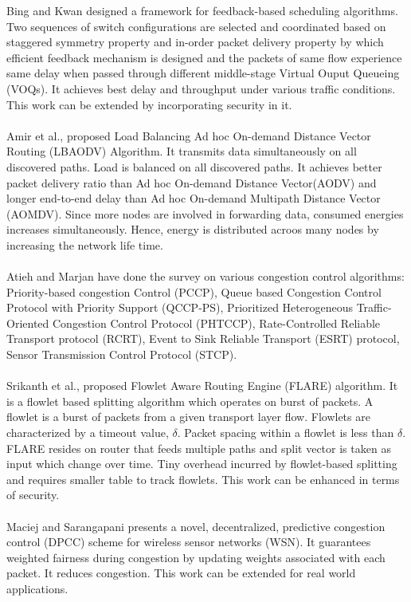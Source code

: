 \documentclass[journal]{IEEEtran}
\begin{document}
\indent Bing and Kwan \cite{VOQ} designed a framework for feedback-based scheduling algorithms.  Two sequences of switch configurations are selected and coordinated based on staggered symmetry property and in-order packet delivery property by which efficient feedback mechanism is designed and the packets of same flow experience same delay when passed through different middle-stage Virtual Ouput Queueing (VOQs). It achieves best delay and throughput under various traffic conditions. This work can be extended by incorporating security in it.\\ \\ 
\indent Amir et al., \cite{LBAODV} proposed Load Balancing Ad hoc On-demand Distance Vector Routing (LBAODV) Algorithm. It transmits data simultaneously on all discovered paths. Load is balanced on all discovered paths. It achieves better packet delivery ratio than Ad hoc On-demand Distance Vector(AODV) and longer end-to-end delay than Ad hoc On-demand Multipath Distance Vector (AOMDV). Since more nodes are involved in forwarding data, consumed energies increases simultaneously. Hence, energy is distributed acroos many nodes by increasing the network life time.\\ \\ 
\indent Atieh and Marjan \cite{Survey} have done the survey on various congestion control algorithms: Priority-based congestion Control (PCCP), Queue based Congestion Control Protocol with Priority Support (QCCP-PS), Prioritized Heterogeneous Traffic-Oriented Congestion Control Protocol (PHTCCP), Rate-Controlled Reliable Transport protocol (RCRT), Event to Sink Reliable Transport (ESRT) protocol, Sensor Transmission Control Protocol (STCP).\\ \\
\indent Srikanth et al., \cite{FLARE} proposed Flowlet Aware Routing Engine (FLARE) algorithm. It is a flowlet based splitting algorithm which operates on burst of packets. A flowlet is a burst of packets from a given transport layer flow. Flowlets are characterized by a timeout value, $\delta$. Packet spacing within a flowlet is less than $\delta$. FLARE resides on router that feeds multiple paths and split vector is taken as input which change over time. Tiny overhead incurred by flowlet-based splitting and requires smaller table to track flowlets. This work can be enhanced in terms of security.\\ \\
\indent Maciej and Sarangapani \cite{DPCC} presents a novel, decentralized, predictive congestion control (DPCC) scheme for wireless sensor networks (WSN). It guarantees weighted fairness during congestion by updating weights associated with each packet. It reduces congestion. This work can be extended for real world applications.\\ \\
\end{document}
